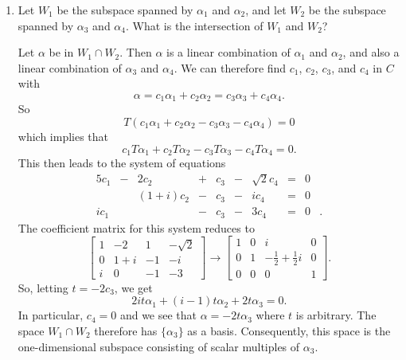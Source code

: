 \begin{enumerate}
\item Let $W_1$ be the subspace spanned by $\alpha_1$ and $\alpha_2$,
  and let $W_2$ be the subspace spanned by $\alpha_3$ and
  $\alpha_4$. What is the intersection of $W_1$ and $W_2$?
  \begin{solution}
    Let $\alpha$ be in $W_1\cap W_2$. Then $\alpha$ is a linear
    combination of $\alpha_1$ and $\alpha_2$, and also a linear
    combination of $\alpha_3$ and $\alpha_4$. We can therefore find
    $c_1$, $c_2$, $c_3$, and $c_4$ in $C$ with
    \begin{equation*}
      \alpha = c_1\alpha_1 + c_2\alpha_2 = c_3\alpha_3 + c_4\alpha_4.
    \end{equation*}
    So
    \begin{equation*}
      T(c_1\alpha_1 + c_2\alpha_2 - c_3\alpha_3 - c_4\alpha_4) = 0
    \end{equation*}
    which implies that
    \begin{equation*}
      c_1T\alpha_1 + c_2T\alpha_2 - c_3T\alpha_3 - c_4T\alpha_4 = 0.
    \end{equation*}
    This then leads to the system of equations
    \begin{alignat*}{5}
      c_1 &{}-{}& 2c_2 &{}+{}& c_3 &{}-{}& \sqrt2c_4 &{}={}& 0 & \\
      && (1 + i)c_2 &{}-{}& c_3 &{}-{}& ic_4 &{}={}& 0 & \\
      ic_1 && &{}-{}& c_3 &{}-{}& 3c_4 &{}={}& 0 &.
    \end{alignat*}
    The coefficient matrix for this system reduces to
    \begin{equation*}
      \begin{bmatrix}
        1 & -2 & 1 & -\sqrt2 \\
        0 & 1 + i & -1 & -i \\
        i & 0 & -1 & -3
      \end{bmatrix}
      \rightarrow
      \begin{bmatrix}
        1 & 0 & i & 0 \\[3pt]
        0 & 1 & -\frac12 + \frac12i & 0 \\[3pt]
        0 & 0 & 0 & 1
      \end{bmatrix}.
    \end{equation*}
    So, letting $t = -2c_3$, we get
    \begin{equation*}
      2it\alpha_1 + (i - 1)t\alpha_2 + 2t\alpha_3 = 0.
    \end{equation*}
    In particular, $c_4 = 0$ and we see that $\alpha = -2t\alpha_3$
    where $t$ is arbitrary. The space $W_1\cap W_2$ therefore has
    $\{\alpha_3\}$ as a basis. Consequently, this space is the
    one-dimensional subspace consisting of scalar multiples of
    $\alpha_3$.
  \end{solution}


\end{enumerate}
